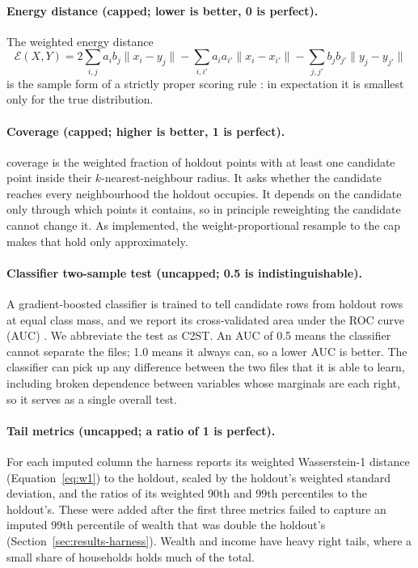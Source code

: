 \paragraph{Energy distance (capped; lower is better, 0 is perfect).}
The weighted energy distance \citep{szekely2013energy}
\begin{equation}
\mathcal{E}(X, Y) = 2 \sum_{i,j} a_i b_j \lVert x_i - y_j \rVert
- \sum_{i,i'} a_i a_{i'} \lVert x_i - x_{i'} \rVert
- \sum_{j,j'} b_j b_{j'} \lVert y_j - y_{j'} \rVert
\label{eq:energy}
\end{equation}
is the sample form of a strictly proper scoring rule
\citep{gneiting2007strictly}: in expectation it is smallest only for the
true distribution.

\paragraph{Coverage (capped; higher is better, 1 is perfect).} \prdc{}
coverage \citep{naeem2020reliable} is the weighted fraction of holdout
points with at least one candidate point inside their
$k$-nearest-neighbour radius. It asks whether the candidate reaches every
neighbourhood the holdout occupies. It depends on the candidate only through
which points it contains, so in principle reweighting the candidate cannot
change it. As implemented, the weight-proportional resample to the cap makes
that hold only approximately.

\paragraph{Classifier two-sample test (uncapped; 0.5 is indistinguishable).}
A gradient-boosted classifier is trained to tell candidate rows from
holdout rows at equal class mass, and we report its cross-validated area
under the ROC curve (AUC) \citep{lopezpaz2017revisiting}. We abbreviate the
test as C2ST. An AUC of 0.5 means the classifier cannot separate the files;
1.0 means it always can, so a lower AUC is better. The classifier can pick
up any difference between the two files that it is able to learn, including
broken dependence between variables whose marginals are each right, so it
serves as a single overall test.

\paragraph{Tail metrics (uncapped; a ratio of 1 is perfect).} For each
imputed column the harness reports its weighted Wasserstein-1 distance
(Equation~\ref{eq:w1}) to the holdout, scaled by the holdout's weighted
standard deviation, and the ratios of its weighted 90th and 99th percentiles
to the holdout's. These were added after the first three metrics failed to
capture an imputed 99th percentile of wealth that was double the holdout's
(Section~\ref{sec:results-harness}). Wealth and income have heavy right
tails, where a small share of households holds much of the total.

